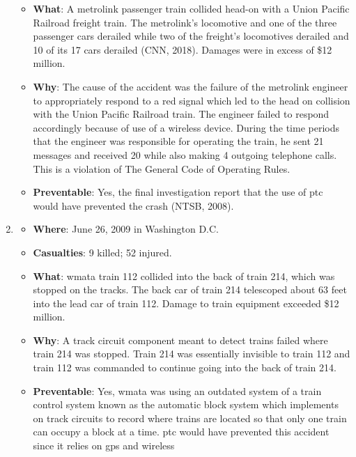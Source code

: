 \documentclass[11pt, titlepage]{article}
\begin{document}
\begin{enumerate}
\begin{itemize}
        \item \textbf{What}: A \gls{metrolink} passenger train collided head-on
        with a Union Pacific Railroad freight train. The \gls{metrolink}’s
        locomotive and one of the three passenger cars derailed while two of the
        freight’s locomotives derailed and 10 of its 17 cars derailed (CNN,
        2018). Damages were in excess of \$12 million.
        \item \textbf{Why}: The cause of the accident was the failure of the
        \gls{metrolink} engineer to appropriately respond to a red signal which
        led to the head on collision with the Union Pacific Railroad train. The
        engineer failed to respond accordingly because of use of a wireless
        device. During the time periods that the engineer was responsible for
        operating the train, he sent 21 messages and received 20 while also
        making 4 outgoing telephone calls. This is a violation of The General
        Code of Operating Rules.
        \item \textbf{Preventable}: Yes, the final investigation report that the
        use of \gls{ptc} would have prevented the crash (NTSB, 2008).
    \end{itemize}
    \item
    \begin{itemize}
        \item \textbf{Where}: June 26, 2009 in Washington D.C.
        \item \textbf{Casualties}: 9 killed; 52 injured.
        \item \textbf{What}: \gls{wmata} train 112 collided into the back of
        train 214, which was stopped on the tracks. The back car of train 214
        telescoped about 63 feet into the lead car of train 112. Damage to train
        equipment exceeded \$12 million.
        \item \textbf{Why}: A track circuit component meant to detect trains
        failed where train 214 was stopped. Train 214 was essentially invisible
        to train 112 and train 112 was commanded to continue going into the back
        of train 214.
        \item \textbf{Preventable}: Yes, \gls{wmata} was using an outdated system
        of a train control system known as the automatic block system which
        implements on track circuits to record where trains are located so that
        only one train can occupy a block at a time. \gls{ptc} would have
        prevented this accident since it relies on \gls{gps} and wireless

\end{itemize}
\end{enumerate}
\end{document}

